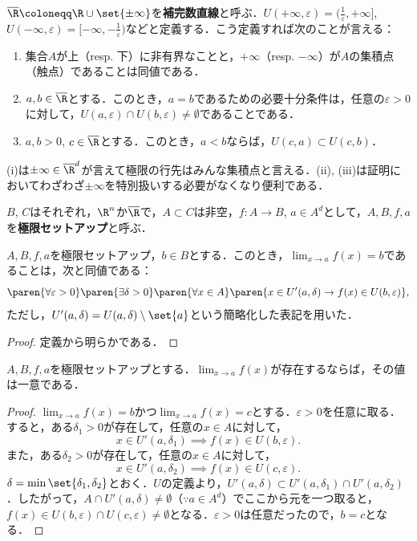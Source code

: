 \documentclass[a4paper,10pt]{ltjsarticle}
\begin{document}
\(\overline\R \coloneqq \R \cup \set{\pm\infty}\)を\textbf{補完数直線}と呼ぶ．\(U(+\infty, \varepsilon) = (\frac1\varepsilon, +\infty]\), \(U(-\infty, \varepsilon) = [-\infty, -\frac1\varepsilon)\)などと定義する．こう定義すれば次のことが言える：
\begin{enumerate}
  \item 集合\(A\)が上（resp. 下）に非有界なことと，\(+\infty\)（resp. \(-\infty\)）が\(A\)の集積点（触点）であることは同値である．
  \item \(a, b \in \overline{\R}\)とする．このとき，\(a = b\)であるための必要十分条件は，任意の\(\varepsilon > 0\)に対して，\(U(a, \varepsilon) \cap U(b, \varepsilon) \ne \emptyset\)であることである．
  \item \(a, b > 0\), \(c \in \overline{\R}\)とする．このとき，\(a < b\)ならば，\(U(c, a) \subset U(c, b)\)．
\end{enumerate}
(i)は\(\pm\infty\in \overline{\R}^d\)が言えて極限の行先はみんな集積点と言える．(ii), (iii)は証明においてわざわざ\(\pm\infty\)を特別扱いする必要がなくなり便利である．

\begin{MyDefinition}
  \(B\), \(C\)はそれぞれ，\(\R^n\)か\(\overline\R\)で，\(A \subset C\)は非空，\(f: A \to B\), \(a \in A^d\)として，\(A, B, f, a\)を\textbf{極限セットアップ}と呼ぶ．
\end{MyDefinition}

\begin{MyProposition}
  \(A, B, f, a\)を極限セットアップ，\(b \in B\)とする．このとき，\(\lim_{x \to a} f(x) = b\)であることは，次と同値である：
  \[ \paren{\forall \varepsilon > 0}\paren{\exists \delta > 0}\paren{\forall x \in A}\paren{x \in U'(a, \delta) \to f(x) \in U(b, \varepsilon)},\]
  ただし，\(U'(a, \delta) = U(a, \delta) \setminus \set{a}\)という簡略化した表記を用いた．
\end{MyProposition}
\begin{proof}
  定義から明らかである．
\end{proof}

\begin{MyProposition}
  \(A, B, f, a\)を極限セットアップとする．\(\lim_{x \to a} f(x)\)が存在するならば，その値は一意である．
\end{MyProposition}
\begin{proof}
  \(\lim_{x \to a} f(x) = b\)かつ\(\lim_{x \to a} f(x) = c\)とする．\(\varepsilon > 0\)を任意に取る．すると，ある\(\delta_1 > 0\)が存在して，任意の\(x \in A\)に対して，
  \[ x \in U'(a, \delta_1) \implies f(x) \in U(b, \varepsilon). \]
  また，ある\(\delta_2 > 0\)が存在して，任意の\(x \in A\)に対して，
  \[ x \in U'(a, \delta_2) \implies f(x) \in U(c, \varepsilon). \]
  \(\delta = \min\set{\delta_1, \delta_2}\)とおく．\(U\)の定義より，\(U'(a, \delta) \subset U'(a, \delta_1) \cap U'(a, \delta_2)\)．したがって，\(A \cap U'(a, \delta) \ne \emptyset\)（\(\because a\in A^d\)）でここから元を一つ取ると，\(f(x) \in U(b, \varepsilon) \cap U(c, \varepsilon) \ne \emptyset\)となる．\(\varepsilon > 0\)は任意だったので，\(b = c\)となる．
\end{proof}
\end{document}
